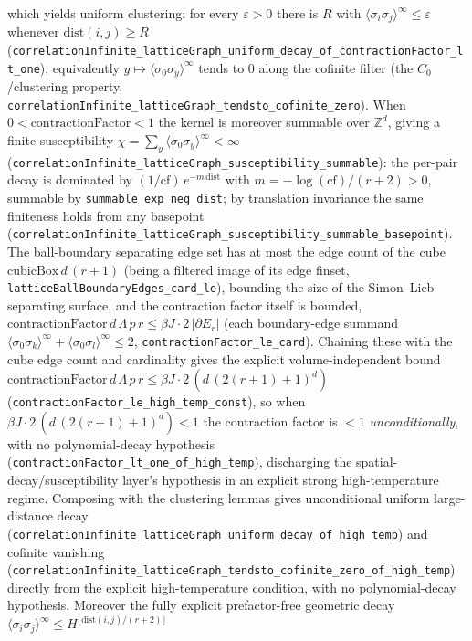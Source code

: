 \documentclass[a4paper,11pt]{article}
\begin{document}
which yields uniform clustering: for every \(\varepsilon>0\) there is \(R\) with
\(\langle\sigma_i\sigma_j\rangle^\infty\le\varepsilon\) whenever
\(\mathrm{dist}(i,j)\ge R\)
(\texttt{correlationInfinite\_latticeGraph\_uniform\_decay\_of\_contractionFactor\_lt\_one}),
equivalently \(y\mapsto\langle\sigma_0\sigma_y\rangle^\infty\) tends to \(0\) along
the cofinite filter (the \(C_0\)/clustering property,
\texttt{correlationInfinite\_latticeGraph\_tendsto\_cofinite\_zero}).  When
\(0<\text{contractionFactor}<1\) the kernel is moreover summable over
\(\mathbb{Z}^d\), giving a finite susceptibility
\(\chi=\sum_y\langle\sigma_0\sigma_y\rangle^\infty<\infty\)
(\texttt{correlationInfinite\_latticeGraph\_susceptibility\_summable}): the
per-pair decay is dominated by \((1/\text{cf})\,e^{-m\,\mathrm{dist}}\) with
\(m=-\log(\text{cf})/(r+2)>0\), summable by \texttt{summable\_exp\_neg\_dist}; by
translation invariance the same finiteness holds from any basepoint
(\texttt{correlationInfinite\_latticeGraph\_susceptibility\_summable\_basepoint}).
The ball-boundary separating edge set has at most the edge count of the cube
\(\mathrm{cubicBox}\,d\,(r+1)\) (being a filtered image of its edge finset,
\texttt{latticeBallBoundaryEdges\_card\_le}), bounding the size of the Simon--Lieb
separating surface, and the contraction factor itself is bounded,
\(\text{contractionFactor}\,d\,\Lambda\,p\,r\le\beta J\cdot 2\,|\partial E_r|\)
(each boundary-edge summand \(\langle\sigma_0\sigma_k\rangle^\infty+\langle\sigma_0\sigma_l\rangle^\infty\le2\),
\texttt{contractionFactor\_le\_card}).  Chaining these with the cube edge count and
cardinality gives the explicit volume-independent bound
\(\text{contractionFactor}\,d\,\Lambda\,p\,r\le\beta J\cdot2\,(d\,(2(r+1)+1)^d)\)
(\texttt{contractionFactor\_le\_high\_temp\_const}), so when
\(\beta J\cdot2\,(d\,(2(r+1)+1)^d)<1\) the contraction factor is \(<1\)
\emph{unconditionally}, with no polynomial-decay hypothesis
(\texttt{contractionFactor\_lt\_one\_of\_high\_temp}), discharging the
spatial-decay/susceptibility layer's hypothesis in an explicit strong
high-temperature regime.  Composing with the clustering lemmas gives
unconditional uniform large-distance decay
(\texttt{correlationInfinite\_latticeGraph\_uniform\_decay\_of\_high\_temp}) and
cofinite vanishing
(\texttt{correlationInfinite\_latticeGraph\_tendsto\_cofinite\_zero\_of\_high\_temp})
directly from the explicit high-temperature condition, with no polynomial-decay
hypothesis.  Moreover the fully explicit prefactor-free geometric decay
\(\langle\sigma_i\sigma_j\rangle^\infty\le H^{\lfloor\mathrm{dist}(i,j)/(r+2)\rfloor}\)
\end{document}
